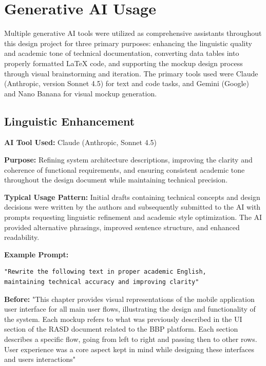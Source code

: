 

\chapter{Generative AI Usage}
Multiple generative AI tools were utilized as comprehensive assistants throughout this design project for three primary purposes: enhancing the linguistic quality and academic tone of technical documentation, converting data tables into properly formatted LaTeX code, and supporting the mockup design process through visual brainstorming and iteration. The primary tools used were Claude (Anthropic, version Sonnet 4.5) for text and code tasks, and Gemini (Google) and Nano Banana for visual mockup generation.

\section{Linguistic Enhancement}

\textbf{AI Tool Used:} Claude (Anthropic, Sonnet 4.5)

\textbf{Purpose:} Refining system architecture descriptions, improving the clarity and coherence of functional requirements, and ensuring consistent academic tone throughout the design document while maintaining technical precision.

\textbf{Typical Usage Pattern:} Initial drafts containing technical concepts and design decisions were written by the authors and subsequently submitted to the AI with prompts requesting linguistic refinement and academic style optimization. The AI provided alternative phrasings, improved sentence structure, and enhanced readability.

\textbf{Example Prompt:}
\begin{verbatim}
"Rewrite the following text in proper academic English, 
maintaining technical accuracy and improving clarity"
\end{verbatim}

\textbf{Before:} "This chapter provides visual representations of the mobile application user interface for all main user flows, illustrating the design and functionality of the system. Each mockup refers to what was previously described in the UI section of the RASD document related to the BBP platform. Each section describes a specific flow, going from left to right and passing then to other rows. User experience was a core aspect kept in mind while designing these interfaces and users interactions"


